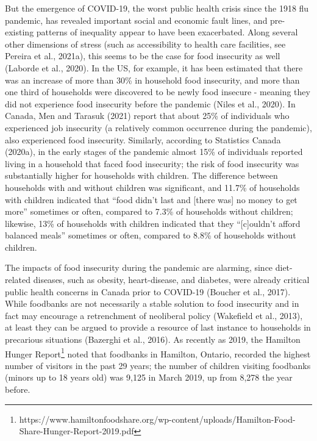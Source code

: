 \documentclass[]{elsarticle} %
\begin{document}
But the emergence of COVID-19, the worst public health crisis since the
1918 flu pandemic, has revealed important social and economic fault
lines, and pre-existing patterns of inequality appear to have been
exacerbated. Along several other dimensions of stress (such as
accessibility to health care facilities, see Pereira et al., 2021a),
this seems to be the case for food insecurity as well (Laborde et al.,
2020). In the US, for example, it has been estimated that there was an
increase of more than 30\% in household food insecurity, and more than
one third of households were discovered to be newly food insecure -
meaning they did not experience food insecurity before the pandemic
(Niles et al., 2020). In Canada, Men and Tarasuk (2021) report that
about 25\% of individuals who experienced job insecurity (a relatively
common occurrence during the pandemic), also experienced food
insecurity. Similarly, according to Statistics Canada (2020a), in the
early stages of the pandemic almost 15\% of individuals reported living
in a household that faced food insecurity; the risk of food insecurity
was substantially higher for households with children. The difference
between households with and without children was significant, and 11.7\%
of households with children indicated that ``food didn't last and
{[}there was{]} no money to get more'' sometimes or often, compared to
7.3\% of households without children; likewise, 13\% of households with
children indicated that they ``{[}c{]}ouldn't afford balanced meals''
sometimes or often, compared to 8.8\% of households without children.

The impacts of food insecurity during the pandemic are alarming, since
diet-related diseases, such as obesity, heart-disease, and diabetes,
were already critical public health concerns in Canada prior to COVID-19
(Boucher et al., 2017). While foodbanks are not necessarily a stable
solution to food insecurity and in fact may encourage a retrenchment of
neoliberal policy (Wakefield et al., 2013), at least they can be argued
to provide a resource of last instance to households in precarious
situations (Bazerghi et al., 2016). As recently as 2019, the Hamilton
Hunger Report\footnote{https://www.hamiltonfoodshare.org/wp-content/uploads/Hamilton-Food-Share-Hunger-Report-2019.pdf}
noted that foodbanks in Hamilton, Ontario, recorded the highest number
of visitors in the past 29 years; the number of children visiting
foodbanks (minors up to 18 years old) was 9,125 in March 2019, up from
8,278 the year before.
\end{document}

